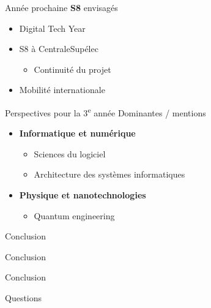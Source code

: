 \documentclass[french, 12pt]{beamer}
\begin{document}
\begin{frame}{Année prochaine}
\textbf{S8} envisagés
\begin{itemize}
    \item Digital Tech Year
    \item S8 à CentraleSupélec
    \begin{itemize}
        \item Continuité du projet
    \end{itemize}
    \item Mobilité internationale
\end{itemize}
\end{frame}

\begin{frame}{Perspectives pour la 3\textsuperscript{e} année}
Dominantes / mentions
\vspace{.5em}
\begin{itemize}
    \item \textbf{Informatique et numérique}
    \begin{itemize}
        \item Sciences du logiciel
        \item Architecture des systèmes informatiques
    \end{itemize}
    \item \textbf{Physique et nanotechnologies}
    \begin{itemize}
        \item Quantum engineering
    \end{itemize}
\end{itemize}
\end{frame}

\begin{frame}{Conclusion}
\begin{center}
    \huge{Conclusion}
\end{center}
\end{frame}

\begin{frame}{Conclusion}
    \begin{center}
        \huge{Questions}
    \end{center}
\end{frame}
\end{document}
